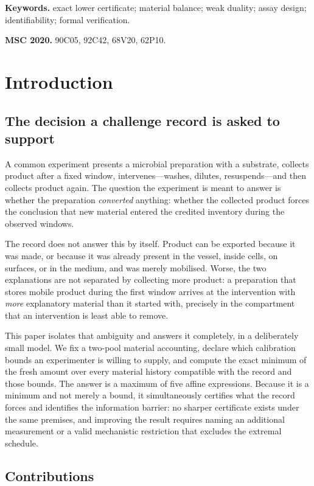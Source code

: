 \documentclass[11pt]{article}
\theoremstyle{plain}
\theoremstyle{definition}
\theoremstyle{remark}
\begin{document}
\noindent\textbf{Keywords.} exact lower certificate; material balance;
weak duality; assay design; identifiability; formal verification.

\medskip
\noindent\textbf{MSC 2020.} 90C05, 92C42, 68V20, 62P10.

\tableofcontents

\section{Introduction}

\subsection{The decision a challenge record is asked to support}

A common experiment presents a microbial preparation with a substrate,
collects product after a fixed window, intervenes---washes, dilutes,
resuspends---and then collects product again. The question the experiment is
meant to answer is whether the preparation \emph{converted} anything: whether
the collected product forces the conclusion that new material entered the
credited inventory during the observed windows.

The record does not answer this by itself. Product can be exported because it
was made, or because it was already present in the vessel, inside cells, on
surfaces, or in the medium, and was merely mobilised. Worse, the two
explanations are not separated by collecting more product: a preparation that
stores mobile product during the first window arrives at the intervention with
\emph{more} explanatory material than it started with, precisely in the
compartment that an intervention is least able to remove.

This paper isolates that ambiguity and answers it completely, in a
deliberately small model. We fix a two-pool material accounting, declare which
calibration bounds an experimenter is willing to supply, and compute the exact
minimum of the fresh amount over every material history compatible with the
record and those bounds. The answer is a maximum of five affine expressions.
Because it is a minimum and not merely a bound, it simultaneously certifies
what the record forces and identifies the information barrier: no sharper
certificate exists under the same premises, and improving the result requires
naming an additional measurement or a valid mechanistic restriction that
excludes the extremal schedule.

\subsection{Contributions}
\end{document}
